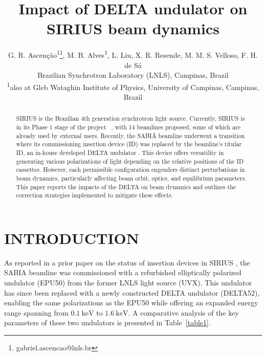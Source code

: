 \documentclass[a4paper,
               keeplastbox,   %
               ]{jacow}
\begin{document}
\title{Impact of DELTA undulator on SIRIUS beam dynamics }

\author{G. R. Ascenção\textsuperscript{1}\thanks{gabriel.ascencao@lnls.br}, M. B. Alves\textsuperscript{1}, L. Liu, X. R. Resende, M. M. S. Velloso, F. H. de Sá\\ Brazilian Synchrotron Laboratory (LNLS), Campinas, Brazil \\
\textsuperscript{1}also at Gleb Wataghin Institute of Physics, University of Campinas, Campinas, Brazil
}

	
\maketitle
%
\begin{abstract}
SIRIUS is the Brazilian 4th generation synchrotron light source. Currently, SIRIUS is in its Phase 1 stage of the project ~\cite{Liu:IPAC23-WEOGA2, Beamlines}, with 14 beamlines proposed, some of which are already used by external users. Recently, the SABIÁ beamline underwent a transition where its commissioning insertion device (ID) was replaced by the beamline's titular ID, an in-house developed DELTA undulator  \cite{Vilela:IPAC17-WEPIK053, Vilela:IPAC18-TUPMK003}. This device offers versatility in generating various polarizations of light depending on the relative positions of the ID cassettes. However,  each permissible configuration engenders distinct perturbations in beam dynamics, particularly affecting beam orbit, optics, and equilibrium parameters. This paper reports the impacts of the DELTA on beam dynamics and outlines the correction strategies implemented to mitigate these effects.
\end{abstract}


\section{INTRODUCTION}
As reported in a prior paper on the status of insertion devices in SIRIUS \cite{Ascenção:IPAC23-MOPM088}, the SABIA beamline was commissioned with a refurbished elliptically polarized undulator (EPU50) from the former LNLS light source (UVX). This undulator has since been replaced with a newly constructed DELTA undulator (DELTA52), enabling the same polarizations as the EPU50 while offering an expanded energy range spanning from $\SI{0.1}{\kilo\electronvolt}$ to $\SI{1.6}{\kilo\electronvolt}$. A comparative analysis of the key parameters of these two undulators is presented in Table~\ref{table1}.
\end{document}
